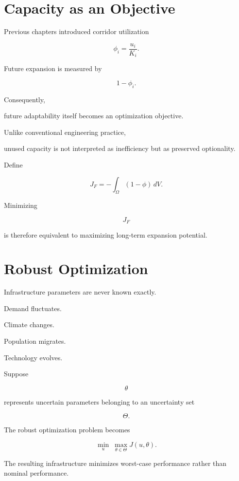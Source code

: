 \documentclass[11pt,fleqn]{book}
\numberwithin{equation}{chapter}
\theoremstyle{plain}
\theoremstyle{definition}
\theoremstyle{remark}
\begin{document}

\section{Capacity as an Objective}

Previous chapters introduced corridor utilization

\[
\phi_i
=
\frac{u_i}{K_i}.
\]

Future expansion is measured by

\[
1-\phi_i.
\]

Consequently,

future adaptability itself becomes an optimization objective.

Unlike conventional engineering practice,

unused capacity is not interpreted as inefficiency but as preserved
optionality.

Define

\[
J_F
=
-
\int_\Omega
(1-\phi)
\,dV.
\]

Minimizing

\[
J_F
\]

is therefore equivalent to maximizing long-term expansion potential.


\section{Robust Optimization}

Infrastructure parameters are never known exactly.

Demand fluctuates.

Climate changes.

Population migrates.

Technology evolves.

Suppose

\[
\theta
\]

represents uncertain parameters belonging to an uncertainty set

\[
\Theta.
\]

The robust optimization problem becomes

\[
\boxed{
\min_u
\;
\max_{\theta\in\Theta}
J(u,\theta).
}
\]

The resulting infrastructure minimizes worst-case performance rather
than nominal performance.

\end{document}
